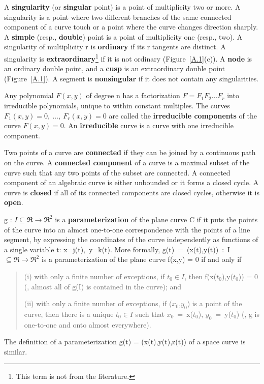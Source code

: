 A {\bf singularity} (or {\bf singular} point) is a point of multiplicity
two or more.
A singularity is a point where two different branches of the same
connected component of a curve touch or a point where the curve changes
direction sharply.
A {\bf simple} (resp., {\bf double}) point is a point of multiplicity one
(resp., two).
A singularity of multiplicity r is {\bf ordinary} if its r tangents are
distinct.
A singularity is {\bf extraordinary}\footnote{This term is not from the 
literature.}
if it is not ordinary (Figure~\ref{A.1}(c)).
A {\bf node} is an ordinary double point, and a {\bf cusp} is an
extraordinary double point (Figure~\ref{A.1}).
A segment is {\bf nonsingular} if it does not contain any singularities.


Any polynomial $F(x,y)$ of degree n has a factorization 
$F = F_{1}F_{2}\ldots F_{r}$ into irreducible polynomials, unique to within
constant multiples.
The curves $F_{1}(x,y) = 0,\ \ldots,\ F_{r}(x,y) = 0$ are called the
{\bf irreducible components} of the curve $F(x,y)=0$.
An {\bf irreducible} curve is a curve with one irreducible component.

Two points of a curve are {\bf connected} if they can be joined by a 
continuous path on the curve.
A {\bf connected component} of a curve is a maximal subset of the
curve such that any two points of the subset are connected.
A connected component of an algebraic curve is either unbounded
or it forms a closed cycle.
A curve is {\bf closed} if all of its connected components are
closed cycles, otherwise it is {\bf open}.

g : $I \subseteq \Re\rightarrow\Re^{2}$ 
is a {\bf parameterization} of the 
plane curve C if it puts the points of the curve
into an almost one-to-one
correspondence with the points of a line segment,
by expressing the coordinates
of the curve independently as functions of a single variable t:
\mbox{x=j(t),\ y=k(t)}.
More formally, \mbox{g(t) = (x(t),y(t)) : I $\subseteq\Re\rightarrow\Re^{2}$}
is a parameterization of the plane curve f(x,y) = 0 if and only if
%
\begin{quote}
\begin{description}
\item{(i)} with only a finite number of exceptions,
if $t_{0} \in I$, then f(x($t_{0}$),y($t_{0}$)) = 0
(\ie, almost all of g(I) is contained in the curve); and
\item{(ii)} with only a finite number of exceptions,
if ($x_{0}$,$y_{0}$) is a point of the curve, then
there is a unique $t_{0}\in I$ such that 
\mbox{$x_{0}$ = x($t_{0}$)}, \mbox{$y_{0}$ = y($t_{0}$)}
(\ie, g is one-to-one and onto almost everywhere).
\end{description}
\end{quote}
The definition of a parameterization g(t) = (x(t),y(t),z(t)) of a space curve
is similar.

